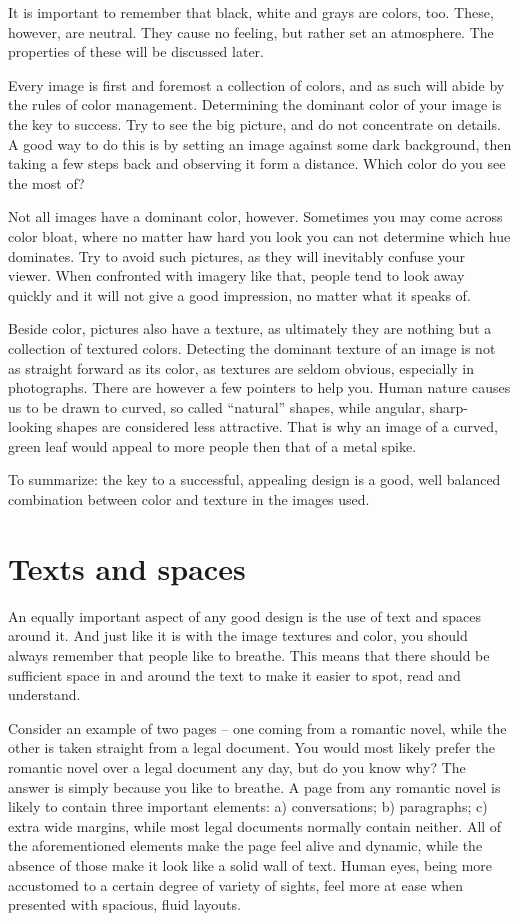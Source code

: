 It is important to remember that black, white and grays are colors, too. These,
however, are neutral. They cause no feeling, but rather set an atmosphere. The
properties of these will be discussed later.

Every image is first and foremost a collection of colors, and as such will abide
by the rules of color management. Determining the dominant color of your image is
the key to success. Try to see the big picture, and do not concentrate on
details. A good way to do this is by setting an image against some dark
background, then taking a few steps back and observing it form a distance. Which
color do you see the most of?

Not all images have a dominant color, however. Sometimes you may come across
color bloat, where no matter haw hard you look you can not determine which hue
dominates. Try to avoid such pictures, as they will inevitably confuse your
viewer. When confronted with imagery like that, people tend to look away quickly
and it will not give a good impression, no matter what it speaks of.

Beside color, pictures also have a texture, as ultimately they are nothing but a
collection of textured colors. Detecting the dominant texture of an image is not as
straight forward as its color, as textures are seldom obvious, especially in
photographs. There are however a few pointers to help you. Human nature causes
us to be drawn to curved, so called ``natural'' shapes, while angular,
sharp-looking shapes are considered less attractive. That is why an image of a
curved, green leaf would appeal to more people then that of a metal spike.

To summarize: the key to a successful, appealing design is a good, well
balanced combination between color and texture in the images used.

\section*{Texts and spaces}

An equally important aspect of any good design is the use of text and
spaces around it. And just like it is with the image textures and color, you
should always remember that people like to breathe. This means that there should be
sufficient space in and around the text to make it easier to spot, read and
understand.

Consider an example of two pages -- one coming from a romantic novel, while the
other is taken straight from a legal document. You would most likely prefer the
romantic novel over a legal document any day, but do you know why? The answer is
simply because you like to breathe. A page from any romantic novel is likely to
contain three important elements: a) conversations; b) paragraphs; c) extra wide
margins, while most legal documents normally contain neither. All of the
aforementioned elements make the page feel alive and dynamic, while the absence
of those make it look like a solid wall of text. Human eyes, being more
accustomed to a certain degree of variety of sights, feel more at ease when
presented with spacious, fluid layouts.

